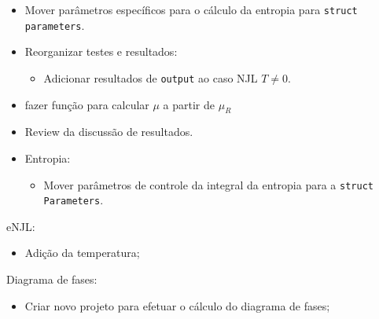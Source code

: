 \begin{itemize}
	\item Mover parâmetros específicos para o cálculo da entropia para \texttt{struct parameters}.
	\item Reorganizar testes e resultados:
		\begin{itemize}
			\item Adicionar resultados de \texttt{output} ao caso NJL $T \neq 0$.
		\end{itemize}
	\item fazer função para calcular $\mu$ a partir de $\mu_R$
	\item Review da discussão de resultados.
	\item Entropia:
		\begin{itemize}
			\item Mover parâmetros de controle da integral da entropia para a \texttt{struct Parameters}.
		\end{itemize}
\end{itemize}

eNJL:
\begin{itemize}
	\item Adição da temperatura;
\end{itemize}

Diagrama de fases:
\begin{itemize}
	\item Criar novo projeto para efetuar o cálculo do diagrama de fases;
\end{itemize}

